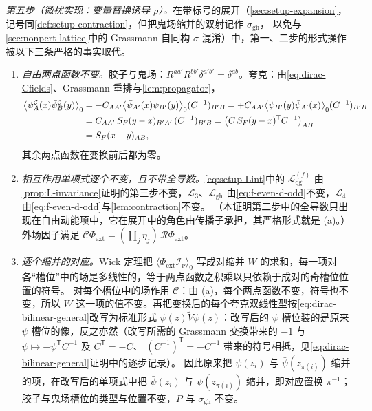 \documentclass[UTF8,a4paper,11pt,fontset=fandol]{ctexart}
\makeatletter
\theoremstyle{cplain}
\theoremstyle{cdefinition}
\theoremstyle{cremark}
\renewcommand{\proofname}{证明}
\renewenvironment{proof}[1][\proofname]{\par\pushQED{\qed}\normalfont\topsep6\p@\@plus6\p@\relax
  \trivlist\item[\hskip\labelsep\itshape #1\hspace{0.5em}]\ignorespaces}{\popQED\endtrivlist\@endpefalse}
\numberwithin{equation}{section}
\newcommand{\tp}{\mathsf{T}}                         %
\newcommand{\Cop}{\mathcal{C}}                       %
\newcommand{\Rop}{\mathcal{R}}                       %
\newcommand{\SF}{S_{F}}                              %
\newcommand{\Cconj}[1]{\widetilde{#1}}              %
\makeatother
\begin{document}
\begin{proof}[推导]
\emph{第五步（微扰实现：变量替换诱导 $\rho$）。}在带标号的展开（\cref{sec:setup-expansion}，记号同\cref{def:setup-contraction}，但把鬼场缩并的双射记作 $\sigma_{\mathrm{gh}}$，
以免与\cref{sec:nonpert-lattice}中的 Grassmann 自同构 $\sigma$ 混淆）中，第一、二步的形式操作被以下三条严格的事实取代。
\begin{enumerate}[label=(\alph*),leftmargin=1.8em,itemsep=1pt,topsep=2pt]
\item \emph{自由两点函数不变。}胶子与鬼场：$R^{aa'}R^{bb'}\delta^{a'b'}=\delta^{ab}$。夸克：由\cref{eq:dirac-Cfields}、Grassmann 重排与\cref{lem:propagator}，
\begin{align}
\bigl\langle\psi^{\Cop}_A(x)\bar\psi^{\Cop}_B(y)\bigr\rangle_0
&=-C_{AA'}\bigl\langle\bar\psi_{A'}(x)\psi_{B'}(y)\bigr\rangle_0(C^{-1})_{B'B}
=+C_{AA'}\bigl\langle\psi_{B'}(y)\bar\psi_{A'}(x)\bigr\rangle_0(C^{-1})_{B'B}\notag\\
&=C_{AA'}\,\SF(y-x)_{B'A'}\,(C^{-1})_{B'B}=\bigl(C\,\SF(y-x)^{\tp}C^{-1}\bigr)_{AB}\notag\\
&=\SF(x-y)_{AB},\label{eq:np-free}
\end{align}
其余两点函数在变换前后都为零。
\item \emph{相互作用单项式逐个不变，且不带全导数。}\cref{eq:setup-Lint}中的 $\mathcal L^{(f)}_{\mathrm{qg}}$ 由\cref{prop:L-invariance}证明的第三步不变，$\mathcal L_3$、$\mathcal L_{\mathrm{gh}}$ 由\cref{eq:f-even-d-odd}不变，$\mathcal L_4$ 由\cref{eq:f-even-d-odd}与\cref{lem:contraction}不变。
（本证明第二步中的全导数只出现在自由动能项中，它在展开中的角色由传播子承担，其严格形式就是 (a)。）外场因子满足 $\Cop\Phi_{\mathrm{ext}}=(\prod_j\eta_j)\,\Rop\Phi_{\mathrm{ext}}$。
\item \emph{逐个缩并的对应。}Wick 定理把 $\langle\Phi_{\mathrm{ext}}\mathcal I_\nu\rangle_0$ 写成对缩并 $W$ 的求和，每一项对各“槽位”中的场是多线性的，等于两点函数之积乘以只依赖于成对的奇槽位位置的符号。
对每个槽位中的场作用 $\Cop$：由 (a)，每个两点函数不变，符号也不变，所以 $W$ 这一项的值不变。再把变换后的每个夸克双线性型按\cref{eq:dirac-bilinear-general}改写为标准形式
$\bar\psi(z)\Cconj V\psi(z)$：改写后的 $\bar\psi$ 槽位装的是原来 $\psi$ 槽位的像，反之亦然（改写所需的 Grassmann 交换带来的 $-1$ 与 $\bar\psi\mapsto-\psi^{\tp}C^{-1}$ 及 $C^{\tp}=-C$、
$(C^{-1})^{\tp}=-C^{-1}$ 带来的符号相抵，见\cref{eq:dirac-bilinear-general}证明中的逐步记录）。
因此原来把 $\psi(z_i)$ 与 $\bar\psi(z_{\pi(i)})$ 缩并的项，在改写后的单项式中把 $\bar\psi(z_i)$ 与 $\psi(z_{\pi(i)})$ 缩并，即对应置换 $\pi^{-1}$；胶子与鬼场槽位的类型与位置不变，$P$ 与 $\sigma_{\mathrm{gh}}$ 不变。

\end{enumerate}
\end{proof}
\end{document}

